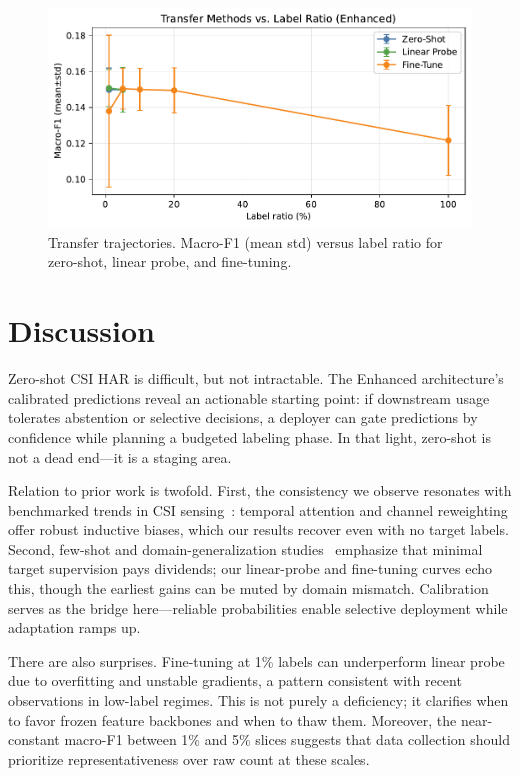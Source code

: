 \documentclass[journal]{IEEEtran}
\begin{document}
\begin{figure}[t]
\centering
\includegraphics[width=\columnwidth]{plots/transfer_compare.pdf}
\caption{Transfer trajectories. Macro-F1 (mean\,\textpm\,std) versus label ratio for zero-shot, linear probe, and fine-tuning.}
\label{fig:transfer_compare}
\end{figure}

\section{Discussion}
Zero-shot CSI HAR is difficult, but not intractable. The Enhanced architecture’s calibrated predictions reveal an actionable starting point: if downstream usage tolerates abstention or selective decisions, a deployer can gate predictions by confidence while planning a budgeted labeling phase. In that light, zero-shot is not a dead end—it is a staging area.

Relation to prior work is twofold. First, the consistency we observe resonates with benchmarked trends in CSI sensing~\cite{yang2023sensefi}: temporal attention and channel reweighting offer robust inductive biases, which our results recover even with no target labels. Second, few-shot and domain-generalization studies~\cite{fewsense2022,airfi2022} emphasize that minimal target supervision pays dividends; our linear-probe and fine-tuning curves echo this, though the earliest gains can be muted by domain mismatch. Calibration serves as the bridge here—reliable probabilities enable selective deployment while adaptation ramps up.

There are also surprises. Fine-tuning at 1\% labels can underperform linear probe due to overfitting and unstable gradients, a pattern consistent with recent observations in low-label regimes. This is not purely a deficiency; it clarifies when to favor frozen feature backbones and when to thaw them. Moreover, the near-constant macro-F1 between 1\% and 5\% slices suggests that data collection should prioritize representativeness over raw count at these scales.
\end{document}
